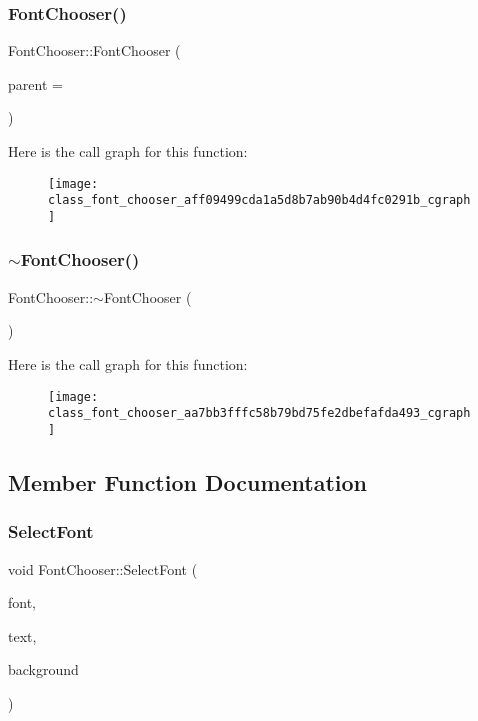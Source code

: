 \subsubsection{Font\+Chooser()}
{\footnotesize\ttfamily Font\+Chooser\+::\+Font\+Chooser (\begin{DoxyParamCaption}\item[{Q\+Widget $\ast$}]{parent = {} }\end{DoxyParamCaption})\hspace{0.3cm}{\ttfamily [explicit]}}

Here is the call graph for this function\+:\nopagebreak
\begin{figure}[H]
\begin{center}
\leavevmode
\texttt{[image: class\_font\_chooser\_aff09499cda1a5d8b7ab90b4d4fc0291b\_cgraph]}
\end{center}
\end{figure}
\mbox{\label{class_font_chooser_aa7bb3fffc58b79bd75fe2dbefafda493}} 
\subsubsection{$\sim$\+Font\+Chooser()}
{\footnotesize\ttfamily Font\+Chooser\+::$\sim$\+Font\+Chooser (\begin{DoxyParamCaption}{ }\end{DoxyParamCaption})}

Here is the call graph for this function\+:\nopagebreak
\begin{figure}[H]
\begin{center}
\leavevmode
\texttt{[image: class\_font\_chooser\_aa7bb3fffc58b79bd75fe2dbefafda493\_cgraph]}
\end{center}
\end{figure}


\subsection{Member Function Documentation}
\mbox{\label{class_font_chooser_afa53ff88473beee487c2a9fd7b7fdca2}} 
\subsubsection{Select\+Font}
{\footnotesize\ttfamily void Font\+Chooser\+::\+Select\+Font (\begin{DoxyParamCaption}\item[{Q\+Font}]{font,  }\item[{Q\+Color}]{text,  }\item[{Q\+Color}]{background }\end{DoxyParamCaption})\hspace{0.3cm}{\ttfamily [signal]}}

